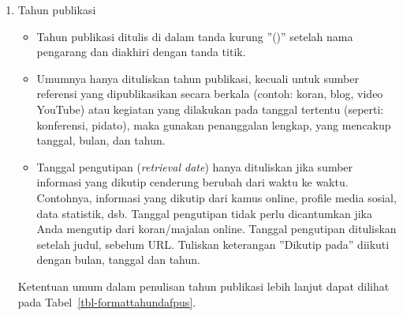 \documentclass[
  indonesian,
  letterpaper,
]{scrbook}
\begin{document}
\begin{enumerate}
\def\labelenumi{\arabic{enumi}.}
\setcounter{enumi}{1}
\item
  Tahun publikasi

  \begin{itemize}
  \item
    Tahun publikasi ditulis di dalam tanda kurung ''()'' setelah nama
    pengarang dan diakhiri dengan tanda titik.
  \item
    Umumnya hanya dituliskan tahun publikasi, kecuali untuk sumber
    referensi yang dipublikasikan secara berkala (contoh: koran, blog,
    video YouTube) atau kegiatan yang dilakukan pada tanggal tertentu
    (seperti: konferensi, pidato), maka gunakan penanggalan lengkap,
    yang mencakup tanggal, bulan, dan tahun.
  \item
    Tanggal pengutipan (\emph{retrieval date}) hanya dituliskan jika
    sumber informasi yang dikutip cenderung berubah dari waktu ke waktu.
    Contohnya, informasi yang dikutip dari kamus online, profile media
    sosial, data statistik, dsb. Tanggal pengutipan tidak perlu
    dicantumkan jika Anda mengutip dari koran/majalan online. Tanggal
    pengutipan dituliskan setelah judul, sebelum URL. Tuliskan
    keterangan ''Dikutip pada'' diikuti dengan bulan, tanggal dan tahun.
  \end{itemize}

  Ketentuan umum dalam penulisan tahun publikasi lebih lanjut dapat
  dilihat pada Tabel~\ref{tbl-formattahundafpus}.


\end{enumerate}
\end{document}
